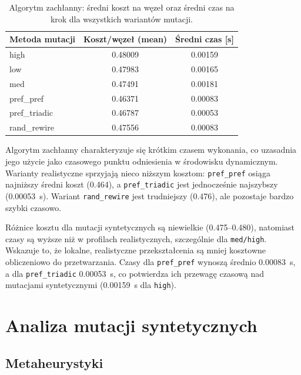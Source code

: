 \begin{table}[H]
  \centering
  \caption{Algorytm zachłanny: średni koszt na węzeł oraz średni czas na krok dla wszystkich wariantów mutacji.}
  \label{tab:greedy-cold-summary}
  \begin{tabular}{lcc}
    \toprule
    \textbf{Metoda mutacji} & \textbf{Koszt/węzeł (mean)} & \textbf{Średni czas [s]} \\
    \midrule
    high                    & 0.48009                     & 0.00159                  \\
    low                     & 0.47983                     & 0.00165                  \\
    med                     & 0.47491                     & 0.00181                  \\
    pref\_pref              & 0.46371                     & 0.00083                  \\
    pref\_triadic           & 0.46787                     & 0.00053                  \\
    rand\_rewire            & 0.47556                     & 0.00083                  \\
    \bottomrule
  \end{tabular}
\end{table}

Algorytm zachłanny charakteryzuje się krótkim czasem wykonania, co uzasadnia jego użycie jako czasowego punktu odniesienia w środowisku dynamicznym. Warianty realistyczne sprzyjają nieco niższym kosztom: \texttt{pref\_pref} osiąga najniższy średni koszt (0.464), a \texttt{pref\_triadic} jest jednocześnie najszybszy (\SI{0.00053}{\s}). Wariant \texttt{rand\_rewire} jest trudniejszy (0.476), ale pozostaje bardzo szybki czasowo.

Różnice kosztu dla mutacji syntetycznych są niewielkie (0.475--0.480), natomiast czasy są wyższe niż w profilach realistycznych, szczególnie dla \texttt{med/high}. Wskazuje to, że lokalne, realistyczne przekształcenia są mniej kosztowne obliczeniowo do przetwarzania. Czasy dla \texttt{pref\_pref} wynoszą średnio \SI{0.00083}{\s}, a dla \texttt{pref\_triadic} \SI{0.00053}{\s}, co potwierdza ich przewagę czasową nad mutacjami syntetycznymi (\SI{0.00159}{\s} dla \texttt{high}).

\section{Analiza mutacji syntetycznych}
\subsection{Metaheurystyki}

